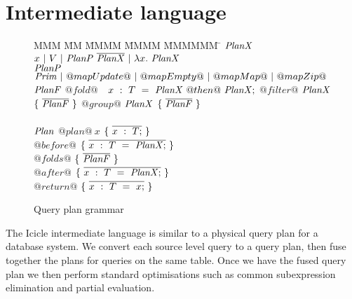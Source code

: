 \section{Intermediate language}
\label{icicle:s:IcicleCore}

\begin{figure}

\begin{tabbing}
MMM \= MM \= MMMM \= MMMM \= MMMMMM \= \kill
$\mathit{PlanX}$
\GrammarDefTab
  $x~|~V~|~\mathit{PlanP}~\overline{\mathit{PlanX}}~|~\lambda{}x.~\mathit{PlanX}$
\\
$\mathit{PlanP}$
\GrammarDefTab
  $\mathit{Prim}~|~@mapUpdate@~|~@mapEmpty@~|~@mapMap@~|~@mapZip@$
\\
$\mathit{PlanF}$
\GrammarDefTab
 $@fold@$ \> $~~x~:~T~=~\mathit{PlanX}~@then@~\mathit{PlanX};$
\GrammarAlt
 $@filter@$ \> $\mathit{PlanX}$ \> $\{~\overline{\mathit{PlanF}}~\}$
\GrammarAlt
  $@group@$ \> $\mathit{PlanX}$ \> $\{~\overline{\mathit{PlanF}}~\}$
\\
\\
$\mathit{Plan}$
\GrammarDefTab
  $@plan@~x$ \> $\{~\overline{x~:~T;}~\}$
\\
  \> \> $@before@$ \> $\{~\overline{x~:~T~=~\mathit{PlanX};}~\}$ \\
  \> \> $@folds@$  \> $\{~\overline{\mathit{PlanF}}~\}$ \\
  \> \> $@after@$  \> $\{~\overline{x~:~T~=~\mathit{PlanX};}~\}$ \\
  \> \> $@return@$ \> $\{~\overline{x~:~T~=~x;}~\}$ \\
\end{tabbing}



\caption{Query plan grammar}
\label{icicle:fig:core:grammar}
\end{figure}

The Icicle intermediate language is similar to a physical query plan for a database system.
We convert each source level query to a query plan, then fuse together the plans for queries on the same table.
Once we have the fused query plan we then perform standard optimisations such as common subexpression elimination and partial evaluation.

